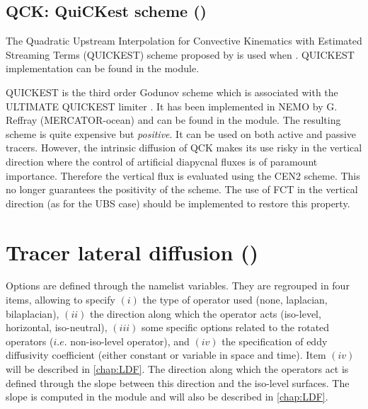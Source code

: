 \documentclass[../tex_main/NEMO_manual]{subfiles}
\begin{document}
\subsection{QCK: QuiCKest scheme (\protect{})}
\label{subsec:TRA_adv_qck}

The Quadratic Upstream Interpolation for Convective Kinematics with Estimated Streaming Terms (QUICKEST) scheme
proposed by \citet{Leonard1979} is used when .
QUICKEST implementation can be found in the  module.

QUICKEST is the third order Godunov scheme which is associated with the ULTIMATE QUICKEST limiter
\citep{Leonard1991}.
It has been implemented in NEMO by G. Reffray (MERCATOR-ocean) and can be found in the  module.
The resulting scheme is quite expensive but \emph{positive}.
It can be used on both active and passive tracers.
However, the intrinsic diffusion of QCK makes its use risky in the vertical direction where
the control of artificial diapycnal fluxes is of paramount importance.
Therefore the vertical flux is evaluated using the CEN2 scheme.
This no longer guarantees the positivity of the scheme.
The use of FCT in the vertical direction (as for the UBS case) should be implemented to restore this property.



\section{Tracer lateral diffusion (\protect{})}
\label{sec:TRA_ldf}

 
Options are defined through the  namelist variables.
They are regrouped in four items, allowing to specify 
$(i)$   the type of operator used (none, laplacian, bilaplacian),
$(ii)$  the direction along which the operator acts (iso-level, horizontal, iso-neutral),
$(iii)$ some specific options related to the rotated operators ($i.e.$ non-iso-level operator), and
$(iv)$  the specification of eddy diffusivity coefficient (either constant or variable in space and time).
Item $(iv)$ will be described in \autoref{chap:LDF}.
The direction along which the operators act is defined through the slope between
this direction and the iso-level surfaces.
The slope is computed in the  module and will also be described in \autoref{chap:LDF}.
\end{document}
